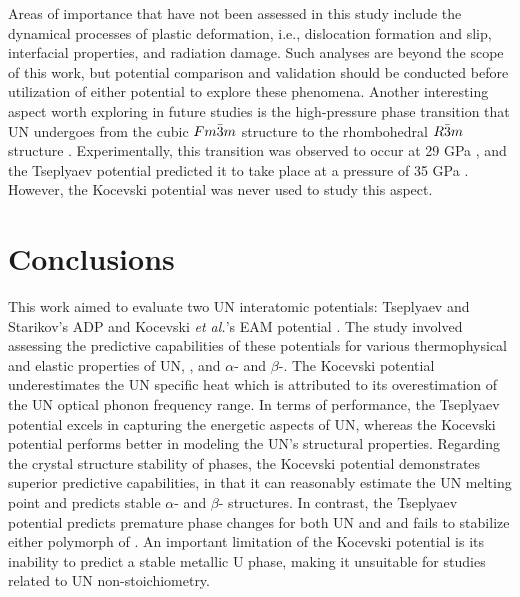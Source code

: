 \documentclass[preprint, 12pt]{elsarticle}
\begin{document}

Areas of importance that have not been assessed in this study include the dynamical processes of plastic deformation, i.e., dislocation formation and slip, interfacial properties, and radiation damage. Such analyses are beyond the scope of this work, but potential comparison and validation should be conducted before utilization of either potential to explore these phenomena. Another interesting aspect worth exploring in future studies is the high-pressure phase transition that UN undergoes from the cubic $Fm\Bar{3}m$ structure to the rhombohedral $R\Bar{3}m$ structure \cite{Olsen1985, Modak2011, Mei2013}. Experimentally, this transition was observed to occur at 29 GPa \cite{Olsen1985}, and the Tseplyaev potential predicted it to take place at a pressure of 35 GPa \cite{Tseplyaev2016}. However, the Kocevski potential was never used to study this aspect.     


\section{Conclusions}

This work aimed to evaluate two UN interatomic potentials: Tseplyaev and Starikov's ADP \cite{Tseplyaev2016} and Kocevski \textit{et al.}'s EAM potential \cite{Kocevski2022II}. The study involved assessing the predictive capabilities of these potentials for various thermophysical and elastic properties of UN, , and $\alpha$- and $\beta$-. The Kocevski potential underestimates the UN specific heat which is attributed to its overestimation of the UN optical phonon frequency range. In terms of performance, the Tseplyaev potential excels in capturing the energetic aspects of UN, whereas the Kocevski potential performs better in modeling the UN's structural properties. Regarding the crystal structure stability of phases, the Kocevski potential demonstrates superior predictive capabilities, in that it can reasonably estimate the UN melting point and predicts stable $\alpha$- and $\beta$- structures. In contrast, the Tseplyaev potential predicts premature phase changes for both UN and  and fails to stabilize either polymorph of . An important limitation of the Kocevski potential is its inability to predict a stable metallic U phase, making it unsuitable for studies related to UN non-stoichiometry.
\end{document}
